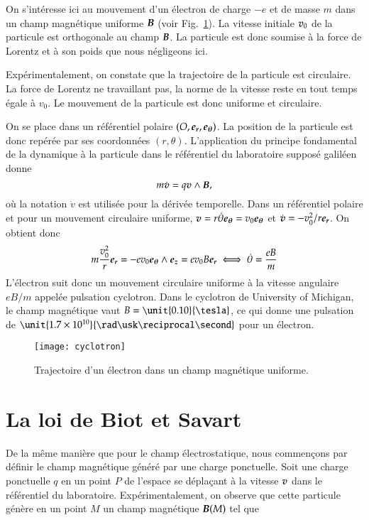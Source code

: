\begin{exemple}
	On s'intéresse ici au mouvement d'un électron de charge $-e$ et de 
	masse $m$ dans un 
	champ magnétique uniforme $\vecb$ (voir Fig.~\ref{fig:magneto_cyclotron}). 
	La vitesse initiale $\vecv_0$ de la particule est orthogonale au champ
	$\vecb$. La particule est donc soumise à la force de Lorentz et à son
	poids que nous négligeons ici. 
	
	Expérimentalement, on constate que la trajectoire 
	de la particule est circulaire. La force de Lorentz ne travaillant pas, 
	la norme de la vitesse reste en tout temps égale à $v_0$. Le mouvement de la 
	particule est donc uniforme et circulaire.
	
	On se place dans
	un référentiel polaire $(O, \er, \etheta)$. La position de la particule
	est donc repérée par ses coordonnées $(r, \theta)$. L'application du principe
	fondamental de la dynamique à la particule dans le référentiel du
	laboratoire supposé galiléen donne
	\begin{equation*}
		m \dot{\vecv} = q \vecv \wedge \vecb,
	\end{equation*}
	où la notation $\dot{v}$ est utilisée pour la dérivée temporelle.
	Dans un référentiel polaire et pour un mouvement circulaire uniforme, 
	$\vecv = r\dot{\theta} \etheta = v_0 \etheta$ 
	et $\dot{\vecv} = - v_0^2/r\er$. On obtient donc
	\begin{equation*}
		m \dfrac{v_0^2}{r}\er = -e v_0 \etheta \wedge \ez =e v_0 B \er \iff 
		\dot{\theta} = \dfrac{eB}{m}
	\end{equation*}
	L'électron suit donc un mouvement circulaire uniforme à la vitesse angulaire
	$eB/m$ appelée pulsation cyclotron. Dans le cyclotron de University of Michigan,
	le champ magnétique vaut $B = \unit{0.10}{\tesla}$, ce qui donne une pulsation de 
	$\unit{1.7 \times 10^{10}}{\rad \usk \reciprocal \second}$ pour un électron.

\end{exemple}
\begin{figure}[h!]
	\centering
	\texttt{[image: cyclotron]}
	\caption{Trajectoire d'un électron dans un champ magnétique uniforme.}%
	\label{fig:magneto_cyclotron}
\end{figure}

\section{La loi de Biot et Savart}
De la même manière que pour le champ électrostatique, nous
commençons par définir le champ magnétique généré par une charge ponctuelle. 
Soit une charge ponctuelle $q$ en un point $P$ de l'espace se déplaçant 
à la vitesse $\vecv$ dans le référentiel du laboratoire. Expérimentalement,
on observe que cette particule génère
en un point $M$ un champ magnétique $\vecb(M)$ tel que

